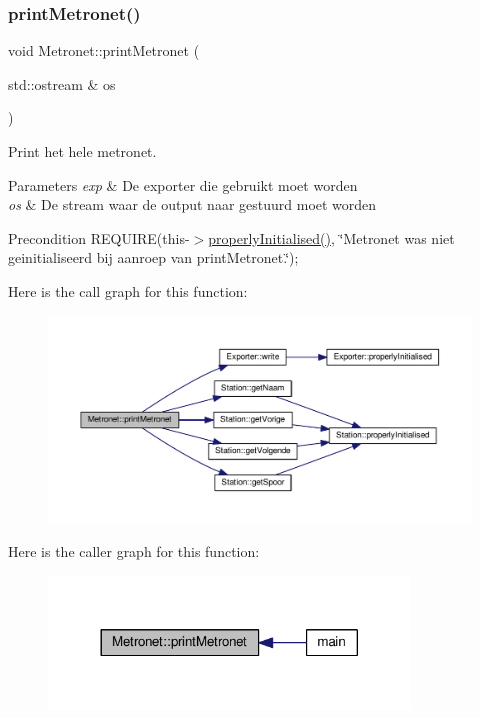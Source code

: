 \subsubsection{\texorpdfstring{print\+Metronet()}{printMetronet()}}
{\footnotesize\ttfamily void Metronet\+::print\+Metronet (\begin{DoxyParamCaption}\item[{std\+::ostream \&}]{os }\end{DoxyParamCaption})}



Print het hele metronet. 


\begin{DoxyParams}{Parameters}
{\em exp} & De exporter die gebruikt moet worden \\
\hline
{\em os} & De stream waar de output naar gestuurd moet worden \\
\hline
\end{DoxyParams}
\begin{DoxyPrecond}{Precondition}
R\+E\+Q\+U\+I\+RE(this-\/$>$\hyperlink{class_metronet_a3d2adce29a947f162924279b766de645}{properly\+Initialised()}, \char`\"{}\+Metronet was niet geinitialiseerd bij aanroep van print\+Metronet.\char`\"{}); 
\end{DoxyPrecond}
Here is the call graph for this function\+:\nopagebreak
\begin{figure}[H]
\begin{center}
\leavevmode
\includegraphics[width=350pt]{class_metronet_a3d8b85c241fff3a9353c06320226e84e_cgraph}
\end{center}
\end{figure}
Here is the caller graph for this function\+:\nopagebreak
\begin{figure}[H]
\begin{center}
\leavevmode
\includegraphics[width=272pt]{class_metronet_a3d8b85c241fff3a9353c06320226e84e_icgraph}
\end{center}
\end{figure}
\mbox{\label{class_metronet_a3d2adce29a947f162924279b766de645}} 
